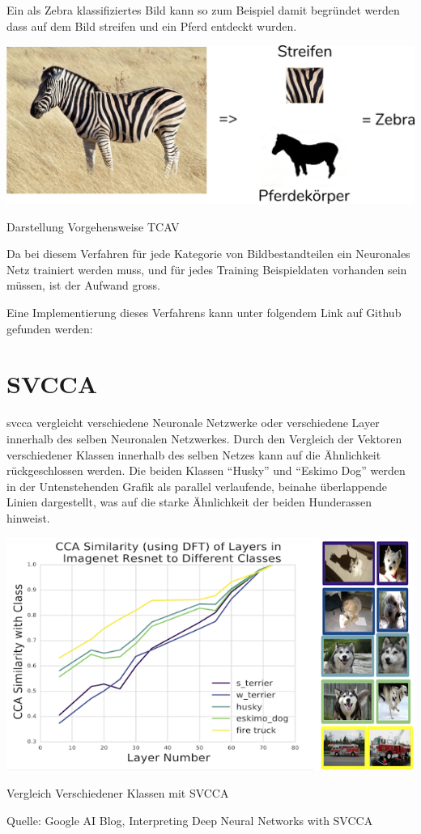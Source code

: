 \documentclass[
  12pt, %
  a4paper, %
  oneside, %
  openany, 
  numbers=noenddot, %
  BCOR=5mm, %
  parskip=half*, %
  thesis, %
]{bfhbook}
\begin{document}
\break
 Ein als Zebra klassifiziertes Bild kann so zum Beispiel damit begründet werden dass auf dem Bild streifen und ein Pferd entdeckt wurden.
\begin{center}
\begin{minipage}[t]{\linewidth}
\includegraphics[width=\textwidth]{Bilder/Zebra-Explanation.PNG}
\caption{Darstellung Vorgehensweise TCAV}
\end{minipage}
\end{center}
Da bei diesem Verfahren für jede Kategorie von Bildbestandteilen ein Neuronales Netz trainiert werden muss, und für jedes Training Beispieldaten vorhanden sein müssen, ist der Aufwand gross. 

Eine Implementierung dieses Verfahrens kann unter folgendem Link auf Github gefunden werden: \cite{tcavLink}

\section{SVCCA}
\acrlong{svcca} \parencite{Raghu2017} vergleicht verschiedene Neuronale Netzwerke oder verschiedene Layer innerhalb des selben Neuronalen Netzwerkes.
\break
Durch den Vergleich der Vektoren verschiedener Klassen innerhalb des selben Netzes kann auf die Ähnlichkeit rückgeschlossen werden. Die beiden Klassen ``Husky'' und ``Eskimo Dog'' werden in der Untenstehenden Grafik als parallel verlaufende, beinahe überlappende Linien dargestellt, was auf die starke Ähnlichkeit der beiden Hunderassen hinweist.
\begin{center}
\begin{minipage}[t]{\linewidth}
 	\includegraphics[width=\textwidth]{Bilder/svcca-similarities.png}
    	\caption{Vergleich Verschiedener Klassen mit SVCCA}
    	\caption*{Quelle: Google AI Blog, Interpreting Deep Neural Networks with SVCCA}
\end{minipage}
\end{center}
\cite{svccaLink}
\end{document}
